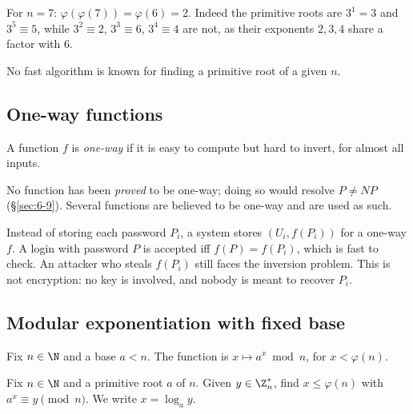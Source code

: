 \begin{example}
For $n=7$: $\varphi(\varphi(7))=\varphi(6)=2$. Indeed the primitive roots are $3^1=3$ and $3^5\equiv5$, while $3^2\equiv2$, $3^3\equiv6$, $3^4\equiv4$ are not, as their exponents $2,3,4$ share a factor with $6$.
\end{example}

\begin{note}
No fast algorithm is known for finding a primitive root of a given $n$.
\end{note}

\subsection{One-way functions}
\label{sec:7-16}

\begin{definition}
A function $f$ is \emph{one-way} if it is easy to compute but hard to invert, for almost all inputs.
\end{definition}

\begin{note}
No function has been \emph{proved} to be one-way; doing so would resolve $P\ne NP$ (\S\ref{sec:6-9}). Several functions are believed to be one-way and are used as such.
\end{note}

\begin{note}
Instead of storing each password $P_i$, a system stores $(U_i,f(P_i))$ for a one-way $f$. A login with password $P$ is accepted iff $f(P)=f(P_i)$, which is fast to check. An attacker who steals $f(P_i)$ still faces the inversion problem. This is not encryption: no key is involved, and nobody is meant to recover $P_i$.
\end{note}

\subsection{Modular exponentiation with fixed base}
\label{sec:7-17}

\begin{definition}
Fix $n\in\N$ and a base $a<n$. The function is $x\longmapsto a^x\bmod n$, for $x<\varphi(n)$.
\end{definition}

\begin{definition}
Fix $n\in\N$ and a primitive root $a$ of $n$. Given $y\in\Z_n^*$, find $x\le\varphi(n)$ with $a^x\equiv y\pmod n$. We write $x=\log_a y$.
\end{definition}

